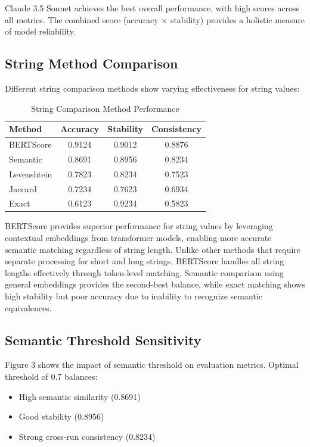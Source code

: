 \documentclass[letterpaper]{article} %
\begin{document}
Claude 3.5 Sonnet achieves the best overall performance, with high scores across all metrics. The combined score (accuracy $\times$ stability) provides a holistic measure of model reliability.

\subsection{String Method Comparison}

Different string comparison methods show varying effectiveness for string values:

\begin{table}[h]
\centering
\caption{String Comparison Method Performance}
\label{tab:string_methods}
\begin{tabular}{lccc}
\toprule
Method & Accuracy & Stability & Consistency \\
\midrule
BERTScore & 0.9124 & 0.9012 & 0.8876 \\
Semantic & 0.8691 & 0.8956 & 0.8234 \\
Levenshtein & 0.7823 & 0.8234 & 0.7523 \\
Jaccard & 0.7234 & 0.7623 & 0.6934 \\
Exact & 0.6123 & 0.9234 & 0.5823 \\
\bottomrule
\end{tabular}
\end{table}

BERTScore provides superior performance for string values by leveraging contextual embeddings from transformer models, enabling more accurate semantic matching regardless of string length. Unlike other methods that require separate processing for short and long strings, BERTScore handles all string lengths effectively through token-level matching. Semantic comparison using general embeddings provides the second-best balance, while exact matching shows high stability but poor accuracy due to inability to recognize semantic equivalences.

\subsection{Semantic Threshold Sensitivity}

Figure 3 shows the impact of semantic threshold on evaluation metrics. Optimal threshold of 0.7 balances:
\begin{itemize}
\item High semantic similarity (0.8691)
\item Good stability (0.8956)
\item Strong cross-run consistency (0.8234)
\end{itemize}
\end{document}
